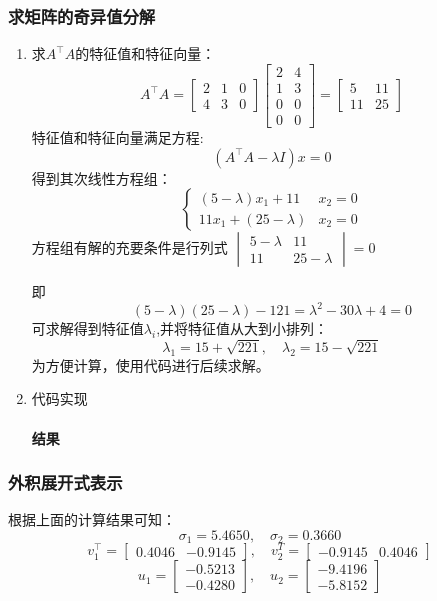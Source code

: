 \documentclass{article}
\begin{document}
\subsubsection{求矩阵的奇异值分解}
\begin{enumerate}[label = {\Roman*.}]
    \item 求$A^\intercal A$的特征值和特征向量：$$
    A^\intercal A = \left[\begin{matrix}2&1&0\\4&3&0\end{matrix}\right] \left[\begin{matrix}2&4\\1&3\\0&0\\0&0\end{matrix}\right] = \left[\begin{matrix}5&11\\11&25\end{matrix}\right]
    $$
    特征值和特征向量满足方程:
    $$
    (A^\intercal A-\lambda I)x=0
    $$
    得到其次线性方程组：
    $$
    \begin{cases}
    (5-\lambda)x_1 + 11&x_2 = 0\\
    11x_1 + (25-\lambda)&x_2 = 0
    \end{cases}
    $$
    方程组有解的充要条件是行列式
    $\begin{vmatrix}5-\lambda&11\\11&25-\lambda\end{vmatrix}=0$
    
    即
    $$
    (5-\lambda)(25-\lambda)-121=\lambda^2-30\lambda+4=0
    $$
    可求解得到特征值$\lambda_i$,并将特征值从大到小排列：
    $$
    \lambda_1 = 15+\sqrt{221},\quad \lambda_2 = 15-\sqrt{221}
    $$
    为方便计算，使用代码进行后续求解。
    \item 代码实现

\paragraph{结果}

\end{enumerate}
\subsubsection{外积展开式表示}
根据上面的计算结果可知：
$$
\sigma_1 = 5.4650,\quad \sigma_2 = 0.3660
$$
$$
v_1^\intercal = \left[\begin{matrix}0.4046& -0.9145\end{matrix}\right],\quad v_2^T = \left[\begin{matrix}-0.9145&0.4046\end{matrix}\right]
$$
$$
u_1 = \left[\begin{matrix}-0.5213\\-0.4280\end{matrix}\right],\quad u_2 = \left[\begin{matrix}-9.4196\\-5.8152\end{matrix}\right]
$$
\end{document}
